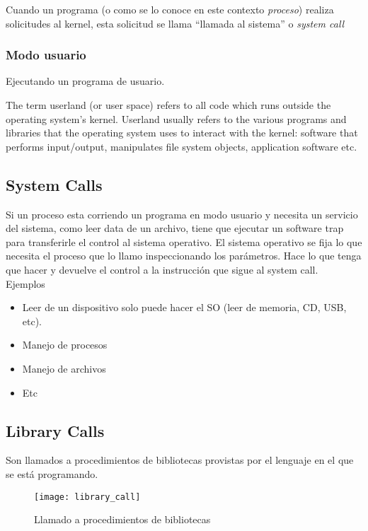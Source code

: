 \documentclass[a4paper, twoside]{article}
\begin{document}
Cuando un programa (o como se lo conoce en este contexto \emph{proceso}) realiza solicitudes al kernel, esta solicitud se llama ``llamada al sistema'' o \emph{system call}

\subsubsection{Modo usuario}
Ejecutando un programa de usuario.

The term userland (or user space) refers to all code which runs outside the operating system's kernel. Userland usually refers to the various programs and libraries that the operating system uses to interact with the kernel: software that performs input/output, manipulates file system objects, application software etc.

\subsection{System Calls}
Si un proceso esta corriendo un programa en modo usuario y necesita un servicio del sistema, como leer data de un archivo, tiene que ejecutar un software trap para transferirle el control al sistema operativo. El sistema operativo se fija lo que necesita el proceso que lo llamo inspeccionando los parámetros. Hace lo que tenga que hacer y devuelve el control a la instrucción que sigue al system call.\\

Ejemplos
\begin{itemize}
	\item Leer de un dispositivo solo puede hacer el SO (leer de memoria, CD, USB, etc).
	\item Manejo de procesos
	\item Manejo de archivos
	\item Etc
\end{itemize}

\subsection{Library Calls}
Son llamados a procedimientos de bibliotecas provistas por el lenguaje en el que se está programando.\\

\begin{figure}[H]
	\centering
	\texttt{[image: library\_call]}
	\caption{Llamado a procedimientos de bibliotecas}
	\label{fig:library_call}
\end{figure}
\end{document}
